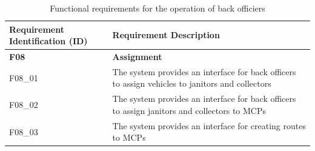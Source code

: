 \documentclass[a4paper, 13pt]{article}
\begin{document}
\begin{table}[h]
    \centering
    \begin{tabular}{| p{} | p{}|} 
    \hline
         Requirement Identification (ID) & Requirement Description \\
         \hline 
         \rowcolor{moccasin} \textbf{F08} & \textbf{Assignment} \\
         \hline
         F08\_01 &  The system provides an interface for back officers to assign vehicles to janitors and collectors \\
         \hline
         F08\_02 &  The system provides an interface for back officers to assign janitors and collectors to MCPs \\
         \hline
         F08\_03 &  The system provides an interface for creating routes to MCPs \\
         \hline
         \end{tabular}
    \caption{Functional requirements for the operation of back officiers}
    \label{tab:my_label}
\end{table}
\end{document}
